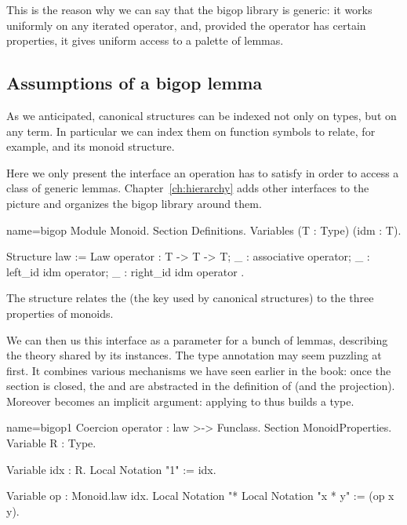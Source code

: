 This is the reason why we can say that the bigop library is generic:
it works uniformly on any iterated operator, and, provided the operator
has certain properties, it gives uniform access to a palette of lemmas.

\subsection{Assumptions of a bigop lemma}\label{sec:bigoplemmas}

As we anticipated, canonical structures can be indexed not only on
types, but on any term.  In particular we can index them on function
symbols to relate, for example,  and its monoid structure.

Here we only present the  interface an operation has to
satisfy in order to access a class of generic lemmas.
Chapter~\ref{ch:hierarchy} adds other interfaces to the picture and organizes
the bigop library around them.

\begin{coq}{name=bigop}{}
Module Monoid.
Section Definitions.
Variables (T : Type) (idm : T).

Structure law := Law {
  operator : T -> T -> T;
  _ : associative operator;
  _ : left_id idm operator;
  _ : right_id idm operator
}.
\end{coq}

The  structure relates the  (the key used by
canonical structures) to the three properties of monoids.

We can then us this interface as a parameter for a bunch of lemmas,
describing the theory shared by  its instances. The 
type annotation may seem puzzling at first. It combines various mechanisms
we have seen earlier in the book: once the section  is
closed, the   and  are
abstracted in the definition of  (and the 
projection).  Moreover  becomes an implicit argument: applying
 to  thus builds a type.

\begin{coq}{name=bigop1}{}
Coercion operator : law >-> Funclass.
Section MonoidProperties.
Variable R : Type.

Variable idx : R.
Local Notation "1" := idx.

Variable op : Monoid.law idx.
Local Notation "*%
Local Notation "x * y" := (op x y).
\end{coq}

